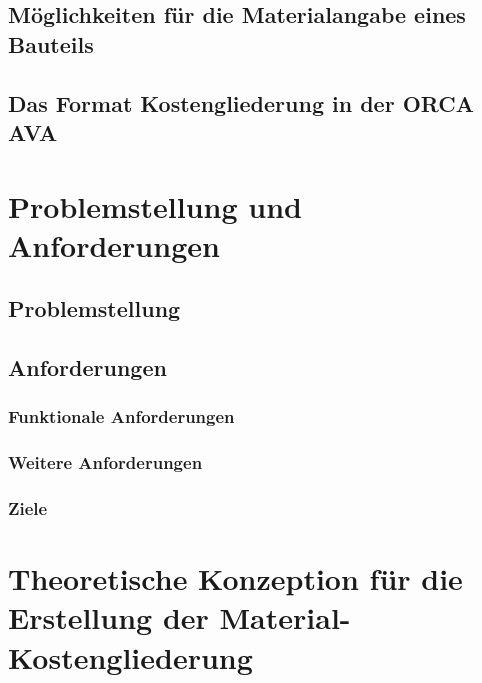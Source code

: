 \subsection{Möglichkeiten für die  Materialangabe eines Bauteils}
\subsection{Das Format Kostengliederung in der ORCA AVA}

\section{Problemstellung und Anforderungen}
\subsection{Problemstellung}
\subsection{Anforderungen}
\subsubsection{Funktionale Anforderungen}
\subsubsection{Weitere Anforderungen}
\subsubsection{Ziele}

\section{Theoretische Konzeption für die Erstellung der Material-Kostengliederung}
